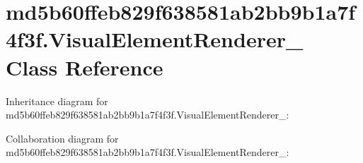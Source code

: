 \hypertarget{classmd5b60ffeb829f638581ab2bb9b1a7f4f3f_1_1_visual_element_renderer__1}{}\section{md5b60ffeb829f638581ab2bb9b1a7f4f3f.\+Visual\+Element\+Renderer\+\_ Class Reference}
\label{classmd5b60ffeb829f638581ab2bb9b1a7f4f3f_1_1_visual_element_renderer__1}


Inheritance diagram for md5b60ffeb829f638581ab2bb9b1a7f4f3f.\+Visual\+Element\+Renderer\+\_\+:


Collaboration diagram for md5b60ffeb829f638581ab2bb9b1a7f4f3f.\+Visual\+Element\+Renderer\+\_\+:
